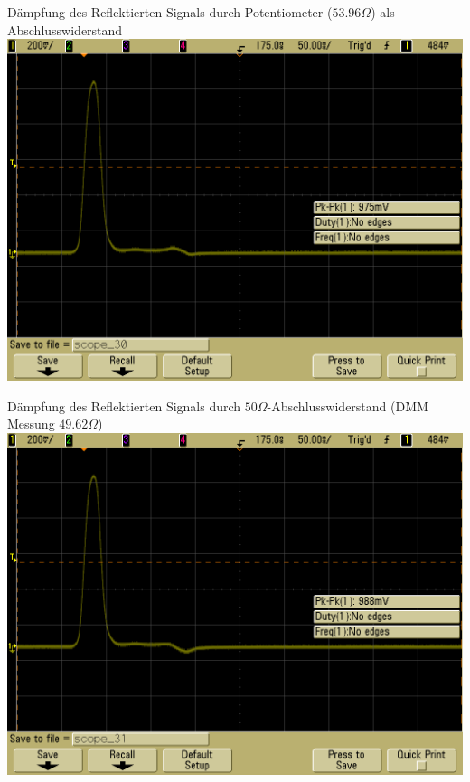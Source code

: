 \documentclass[compress,11pt]{beamer}
\begin{document}
\begin{frame}
\begin{block}{Dämpfung des Reflektierten Signals durch Potentiometer ($53.96\Omega$) als Abschlusswiderstand}
\centering
\includegraphics[width=.85\textwidth]{../daten/scope_30.png}
\end{block}
\end{frame}

\begin{frame}
\begin{block}{Dämpfung des Reflektierten Signals durch $50\Omega$-Abschlusswiderstand (DMM Messung $49.62\Omega$)}
\centering
\includegraphics[width=.85\textwidth]{../daten/scope_31.png}
\end{block}
\end{frame}
\end{document}
